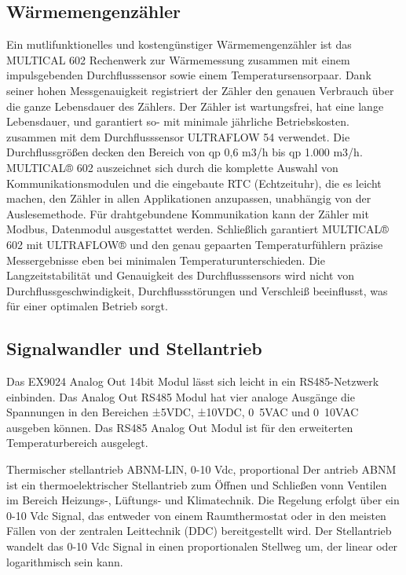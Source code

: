 \subsection{Wärmemengenzähler}

Ein mutlifunktionelles und kostengünstiger Wärmemengenzähler ist das MULTICAL 602 Rechenwerk zur Wärmemessung zusammen mit einem impulsgebenden Durchflusssensor sowie einem Temperatursensorpaar. 
Dank seiner hohen Messgenauigkeit registriert der Zähler den genauen Verbrauch über die ganze Lebensdauer des Zählers. Der Zähler ist wartungsfrei, hat eine lange Lebensdauer, und garantiert so- mit minimale jährliche Betriebskosten.
zusammen mit dem Durchflusssensor ULTRAFLOW 54 verwendet. Die Durchflussgrößen decken den Bereich von qp 0,6 m3/h bis qp 1.000 m3/h.
MULTICAL® 602 auszeichnet sich durch die komplette Auswahl von Kommunikationsmodulen und die eingebaute RTC (Echtzeituhr), die es leicht machen, den Zähler in allen Applikationen anzupassen, unabhängig von der Auslesemethode.
Für drahtgebundene Kommunikation kann der Zähler mit Modbus, Datenmodul ausgestattet werden.
Schließlich garantiert MULTICAL® 602 mit ULTRAFLOW® und den genau gepaarten Temperaturfühlern präzise Messergebnisse eben bei minimalen Temperaturunterschieden. Die Langzeitstabilität und Genauigkeit des Durchflusssensors wird nicht von Durchflussgeschwindigkeit, Durchflussstörungen und Verschleiß beeinflusst, was für einer optimalen Betrieb sorgt.

\subsection{Signalwandler und Stellantrieb}

Das EX9024 Analog Out 14bit Modul lässt sich leicht in ein RS485-Netzwerk einbinden. Das Analog Out RS485 Modul hat vier analoge Ausgänge die Spannungen in den Bereichen ±5VDC, ±10VDC, 0~5VAC und 0~10VAC ausgeben können. Das RS485 Analog Out Modul ist für den erweiterten Temperaturbereich ausgelegt.

Thermischer stellantrieb ABNM-LIN, 0-10 Vdc, proportional
Der antrieb ABNM ist ein thermoelektrischer Stellantrieb zum Öffnen und Schließen vonn Ventilen im Bereich Heizungs-, Lüftungs- und Klimatechnik.
Die Regelung erfolgt über ein 0-10 Vdc Signal, das entweder von einem Raumthermostat oder in den meisten Fällen von der zentralen Leittechnik (DDC) bereitgestellt wird. Der Stellantrieb wandelt das 0-10 Vdc Signal in einen proportionalen Stellweg um, der linear oder logarithmisch sein kann.



